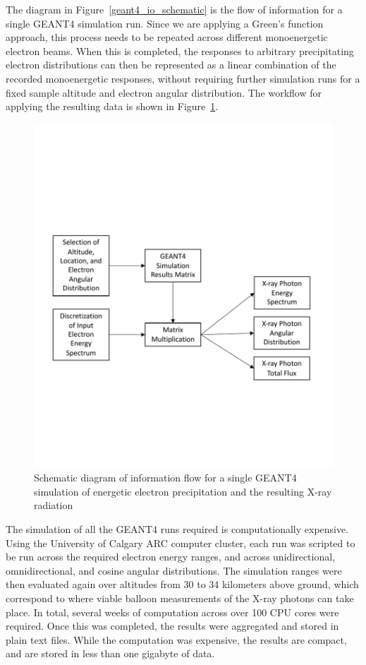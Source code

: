 The diagram in Figure~\ref{geant4_io_schematic} is the flow of information for a single GEANT4 simulation run. Since we are applying a Green's function approach, this process needs to be repeated across different monoenergetic electron beams. When this is completed, the responses to arbitrary precipitating electron distributions can then be represented as a linear combination of the recorded monoenergetic responses, without requiring further simulation runs for a fixed sample altitude and electron angular distribution. The workflow for applying the resulting data is shown in Figure~\ref{geant4_how_to_use}.

\begin{figure}[p]
\label{geant4_how_to_use}
\includegraphics[width=1.0\textwidth]{figures/chapter_3/geant4_how_to_use/geant4_how_to_use}
\caption{Schematic diagram of information flow for a single GEANT4 simulation of energetic electron precipitation and the resulting X-ray radiation}
\end{figure}

The simulation of all the GEANT4 runs required is computationally expensive. Using the University of Calgary ARC computer cluster, each run was scripted to be run across the required electron energy ranges, and across unidirectional, omnidirectional, and cosine angular distributions. The simulation ranges were then evaluated again over altitudes from 30 to 34 kilometers above ground, which correspond to where viable balloon measurements of the X-ray photons can take place. In total, several weeks of computation across over 100 CPU cores were required. Once this was completed, the results were aggregated and stored in plain text files. While the computation was expensive, the results are compact, and are stored in less than one gigabyte of data.
